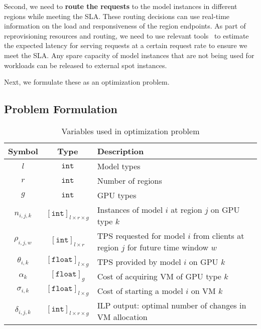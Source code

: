 Second, we need to \textbf{route the requests} to the model instances in different regions while meeting the SLA. These routing decisions can use real-time information on the load and responsiveness of the region endpoints.
As part of reprovisioning resources and routing, we need to use relevant tools~\cite{splitwise} to estimate the expected latency for serving requests at a certain request rate to ensure we meet the SLA.
%
Any spare capacity of model instances that are not being used for workloads can be released to external spot instances.

Next, we formulate these as an optimization problem. 


\subsection{Problem Formulation} \label{sec:optimization}
\begin{table}[t]
\setlength{\tabcolsep}{2pt} %
    \centering
   \caption{Variables used in optimization problem}
    \label{tab:ILP_var}
    \begin{tabular}{ccp{5.3cm}}
    \hline
        \bf Symbol & \bf Type  & \bf Description \\
         \hline\hline
$l$ & $\texttt{int}$ &  Model types  \\
$r$ & $\texttt{int}$ & Number of regions\\
$g$ & $\texttt{int}$  & GPU types\\
$n_{i, j, k}$ &$[\texttt{int}]_{l\times r\times g}$ & Instances of model $i$ at region $j$ on GPU type $k$\\ %
 $\rho_{i, j, w}$ & $[\texttt{int}]_{l\times r}$ & {TPS requested} for model $i$ from clients at region $j$ for future time window $w$ \\ %
$\theta_{i, k}$ & $ [\texttt{float}]_{l\times g}$ &  TPS provided by model $i$ on GPU $k$ \\
 $\alpha_{k}$ & $[\texttt{float}]_{g}$ & Cost of acquiring VM of GPU type $k$ \\ %
 $\sigma_{i, k}$ & $[\texttt{float}]_{l\times g}$ &  Cost of starting a model $i$ on VM $k$ \\
    \hline
    $\delta_{i, j, k}$ & $[\texttt{int}]_{l\times r\times g}$ & ILP output: optimal number of changes in VM allocation\\
    \hline
    \end{tabular}
\end{table}


